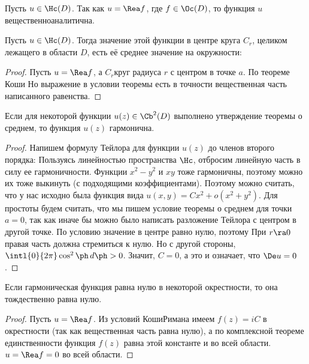\documentclass[a4paper]{article}
\begin{document}
Пусть $u\in \Hc(D)$. Так как $u = \Rea f$, где $f \in\Oc(D)$, то функция $u$ вещественно\д аналитична.

\begin{theorem}[о среднем]
Пусть $u \in \Hc(D)$. Тогда значение этой функции в центре круга $C_r$, целиком лежащего в области $D$, есть её
среднее значение на окружности:
\end{theorem}
\begin{proof}
Пусть $u = \Rea f$, а $C_r$\т круг радиуса $r$ с центром в точке $a$. По теореме Коши
Но выражение в условии теоремы есть в точности  вещественная часть написанного равенства.
\end{proof}

\begin{theorem}
Если для некоторой функции $u(z) \in \Cb^2(D)$ выполнено утверждение теоремы о среднем, то функция $u(z)$ гармонична.
\end{theorem}
\begin{proof}
Напишем формулу Тейлора для функции $u(z)$ до членов второго порядка:
Пользуясь линейностью  пространства $\Hc$, отбросим линейную часть в силу ее
гармоничности. Функции $x^2-y^2$ и $xy$ тоже гармоничны, поэтому можно их тоже выкинуть (с подходящими
коэффициентами). Поэтому можно считать, что у нас исходно была функция вида $u(x,y) = C x^2 + o(x^2+y^2)$. Для
простоты будем считать, что мы пишем условие теоремы о среднем для точки $a=0$, так как иначе бы можно
было написать разложение Тейлора с центром в другой точке. По условию значение в центре равно нулю, поэтому
При $r \ra 0$ правая часть должна стремиться к нулю.  Но с
другой стороны, $\intl{0}{2\pi}\cos^2\ph\,d\ph > 0$. Значит, $C = 0$, а это и означает, что $\De u = 0$.
\end{proof}

\begin{theorem}[единственности]
Если гармоническая функция равна нулю в некоторой окрестности, то она тождественно равна нулю.
\end{theorem}
\begin{proof}
Пусть $u =\Rea f$. Из условий Коши\ч Римана имеем $f(z) = iC$ в окрестности (так как
вещественная часть равна нулю), а по комплексной теореме единственности функция $f(z)$ равна
этой константе и во всей области.  $u = \Rea f=0$ во всей области.
\end{proof}
\end{document}
